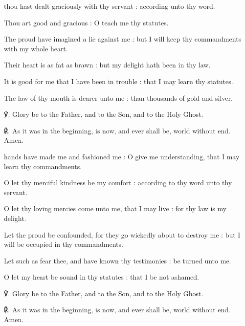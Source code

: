 \begin{multicols}{2}
 thou hast dealt graciously with thy servant : according unto thy word.\par
{}
Thou art good and gracious : O teach me thy statutes.\par
{}The proud have imagined a lie against me : but I will keep thy commandments with my whole heart.\par
{}Their heart is as fat as brawn : but my delight hath been in thy law.\par
{}It is good for me that I have been in trouble : that I may learn thy statutes.\par
{}The law of thy mouth is dearer unto me : than thousands of gold and silver.\par
℣. Glory be to the Father, and to the Son, and to the Holy Ghost.\par
℟. As it was in the beginning, is now, and ever shall be, world without end. Amen.

\vspace{-2ex}

 hands have made me and fashioned me : O give me understanding, that I may learn thy commandments.\par
{}
O let thy merciful kindness be my comfort : according to thy word unto thy servant.\par
{}O let thy loving mercies come unto me, that I may live : for thy law is my delight.\par
{}Let the proud be confounded, for they go wickedly about to destroy me : but I will be occupied in thy commandments.\par
{}Let such as fear thee, and have known thy testimonies : be turned unto me.\par
{}O let my heart be sound in thy statutes : that I be not ashamed.\par
℣. Glory be to the Father, and to the Son, and to the Holy Ghost.\par
℟. As it was in the beginning, is now, and ever shall be, world without end. Amen.


\end{multicols}
